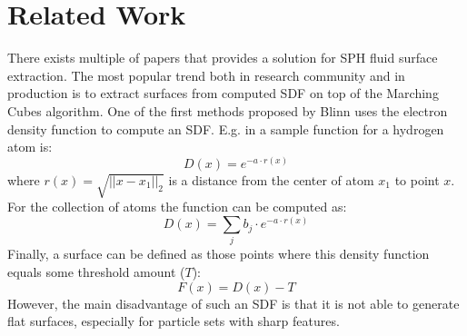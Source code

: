 \chapter{Related Work}\label{sec:related-work}
There exists multiple of papers that provides a solution for SPH fluid surface extraction. The most popular trend  both in research community and in production is to extract surfaces from computed SDF on top of the Marching Cubes algorithm. One of the first methods proposed by Blinn uses the electron density function to compute an SDF. E.g. in \cite{Blinn} a sample function for a  hydrogen atom is:
\begin{equation}
	D(x) = e^{-a\cdot r(x)}
\end{equation}
where $r(x) = \sqrt{||x - x_1||_2}$ is a distance from the center of atom $x_1$ to point $x$. For the collection of atoms the function can be computed as:
\begin{equation}
	D(x) = \sum_j{b_j\cdot e^{-a\cdot r(x)}}
\end{equation}
Finally, a surface can be defined as those points where this density function equals some threshold amount ($T$):
\begin{equation}
	F(x) = D(x) - T
\end{equation}
However, the main disadvantage of such an SDF is that it is not able to generate flat surfaces, especially for particle sets with sharp features.\\

